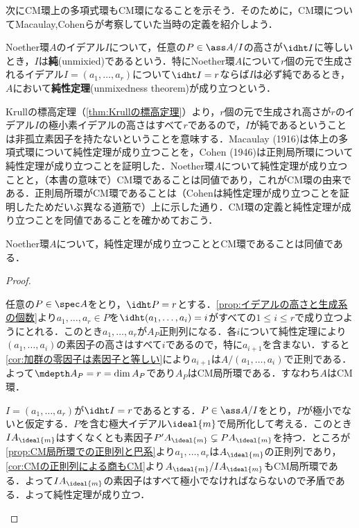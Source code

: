 次にCM環上の多項式環もCM環になることを示そう．そのために，CM環についてMacaulay,Cohenらが考察していた当時の定義を紹介しよう．

\begin{defi}[純性定理]
	Noether環$A$のイデアル$I$について，任意の$P\in\ass A/I$の高さが$\idht I$に等しいとき，$I$は\textbf{純}(unmixied)であるという．特にNoether環$A$について$r$個の元で生成されるイデアル$I=(a_1,\dots,a_r)$について$\idht I=r$ならば$I$は必ず純であるとき，$A$において\textbf{純性定理}(unmixedness theorem)が成り立つという．
\end{defi}

Krullの標高定理（\ref{thm:Krullの標高定理}）より，$r$個の元で生成され高さが$r$のイデアル$I$の極小素イデアルの高さはすべて$r$であるので，$I$が純であるということは非孤立素因子を持たないということを意味する．Macaulay (1916)は体上の多項式環について純性定理が成り立つことを，Cohen (1946)は正則局所環について純性定理が成り立つことを証明した．Noether環$A$について純性定理が成り立つことと，（本書の意味で）CM環であることは同値であり，これがCM環の由来である．正則局所環がCM環であることは（Cohenは純性定理が成り立つことを証明したためだいぶ異なる道筋で）上に示した通り．CM環の定義と純性定理が成り立つことを同値であることを確かめておこう．

\begin{thm}
	Noether環$A$について，純性定理が成り立つこととCM環であることは同値である．
\end{thm}

\begin{proof}
	\begin{eqv}
		\item 任意の$P\in\spec A$をとり，$\idht P=r$とする．\ref{prop:イデアルの高さと生成系の個数}より$a_1,\dots,a_r\in P$を$\idht(a_1,\dots,a_i)=i$がすべての$1\leq i\leq r$で成り立つようにとれる．このとき$a_1,\dots,a_r$が$A_P$正則列になる．各$i$について純性定理により$(a_1,\dots,a_i)$の素因子の高さはすべて$i$であるので，特に$a_{i+1}$を含まない．すると\ref{cor:加群の零因子は素因子と等しい}により$a_{i+1}$は$A/(a_1,\dots,a_i)$で正則である．よって$\mdepth A_P=r=\dim A_P$であり$A_P$はCM局所環である．すなわち$A$はCM環．
		\item $I=(a_1,\dots,a_r)$が$\idht I=r$であるとする．$P\in\ass A/I$をとり，$P$が極小でないと仮定する．$P$を含む極大イデアル$\ideal{m}$で局所化して考える．このとき$IA_{\ideal{m}}$はすくなくとも素因子$P'A_{\ideal{m}}\subsetneq PA_{\ideal{m}}$を持つ．ところが\ref{prop:CM局所環での正則列と巴系}より$a_1,\dots,a_r$は$A_{\ideal{m}}$の正則列であり，\ref{cor:CMの正則列による商もCM}より$A_{\ideal{m}}/IA_{\ideal{m}}$もCM局所環である．よって$IA_{\ideal{m}}$の素因子はすべて極小でなければならないので矛盾である．よって純性定理が成り立つ．
	\end{eqv}
\end{proof}

